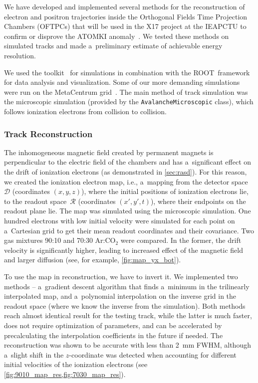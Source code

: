 	We have developed and implemented several methods for the reconstruction of electron and positron trajectories inside the Orthogonal Fields Time Projection Chambers (\acp{OFTPC}) that will be used in the X17 project at the \acf{IEAPCTU} to confirm or disprove the ATOMKI anomaly~\cite{atomki_be}. We tested these methods on simulated tracks and made a~preliminary estimate of achievable energy resolution.
	
	We used the \garfieldpp toolkit~\cite{Garfield++} for simulations in combination with the ROOT~framework~\cite{ROOT} for data analysis and visualization. Some of our more demanding simulations were run on the MetaCentrum grid~\cite{metacentrum}. The main method of track simulation was the microscopic simulation (provided by the \texttt{Avalanche\-Microscopic} class), which follows ionization electrons from collision to collision.
	
	\subsubsection*{Track Reconstruction}
		The inhomogeneous magnetic field created by permanent magnets is perpendicular to the electric field of the chambers and has a~significant effect on the drift of ionization electrons (as demonstrated in \cref{sec:rasd}). For this reason, we created the ionization electron map, i.e., a~mapping from the detector space~$\mathcal{D}$ (coordinates $(x,y,z)$), where the initial positions of ionization electrons lie, to the readout space~$\mathcal{R}$ (coordinates $(x',y',t)$), where their endpoints on the readout plane lie. The map was simulated using the microscopic simulation. One hundred electrons with low initial velocity were simulated for each point on a~Cartesian grid to get their mean readout coordinates and their covariance. Two gas mixtures 90:10 and 70:30 Ar:CO$_2$ were compared. In the former, the drift velocity is significantly higher, leading to increased effect of the magnetic field and larger diffusion (see, for example, \cref{fig:map_yx_bot}).
		
		To use the map in reconstruction, we have to invert it. We implemented two methods -- a~gradient descent algorithm that finds a~minimum in the trilinearly interpolated map, and a~polynomial interpolation on the inverse grid in the readout space (where we know the inverse from the simulation). Both methods reach almost identical result for the testing track, while the latter is much faster, does not require optimization of parameters, and can be accelerated by precalculating the interpolation coefficients in the future if needed. The reconstruction was shown to be accurate with less than \qty{2}{\mm} \acs{FWHM}, although a~slight shift in the $z$\nobreakdash-coordinate was detected when accounting for different initial velocities of the ionization electrons (see \cref{fig:9010_map_res,fig:7030_map_res}).
		
